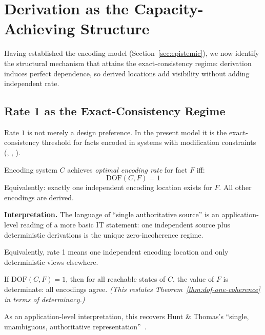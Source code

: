 \section{Derivation as the Capacity-Achieving Structure}\label{sec:ssot}

Having established the encoding model (Section~\ref{sec:epistemic}), we now identify the structural mechanism that attains the exact-consistency regime: derivation induces perfect dependence, so derived locations add visibility without adding independent rate.

\subsection{Rate 1 as the Exact-Consistency Regime}\label{sec:ssot-def}

Rate $1$ is not merely a design preference. In the present model it is the exact-consistency threshold for facts encoded in systems with modification constraints (, , ).

\begin{definition}[Optimal Encoding (DOF = 1)]\label{def:ssot}
Encoding system $C$ achieves \emph{optimal encoding rate} for fact $F$ iff:
\[
\text{DOF}(C, F) = 1
\]
Equivalently: exactly one independent encoding location exists for $F$. All other encodings are derived.
\end{definition}

\textbf{Interpretation.} The language of ``single authoritative source'' is an application-level reading of a more basic IT statement: one independent source plus deterministic derivations is the unique zero-incoherence regime.

Equivalently, rate 1 means one independent encoding location and only deterministic views elsewhere.

\begin{corollary}[DOF = 1 Guarantees Determinacy]\label{thm:ssot-determinate}
If $\text{DOF}(C, F) = 1$, then for all reachable states of $C$, the value of $F$ is determinate: all encodings agree. \emph{(This restates Theorem~\ref{thm:dof-one-coherence} in terms of determinacy.)}
\end{corollary}

As an application-level interpretation, this recovers Hunt \& Thomas's ``single, unambiguous, authoritative representation''~\cite{hunt1999pragmatic}.

